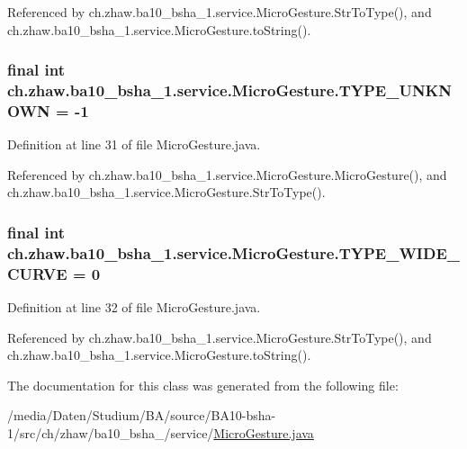 Referenced by ch.zhaw.ba10\_\-bsha\_\-1.service.MicroGesture.StrToType(), and ch.zhaw.ba10\_\-bsha\_\-1.service.MicroGesture.toString().\hypertarget{classch_1_1zhaw_1_1ba10__bsha__1_1_1service_1_1MicroGesture_a5f903774e82629582f34b094f636cc07}{
\subsubsection[{TYPE\_\-UNKNOWN}]{\setlength{\rightskip}{0pt plus 5cm}final int {\bf ch.zhaw.ba10\_\-bsha\_\-1.service.MicroGesture.TYPE\_\-UNKNOWN} = -\/1}}
\label{classch_1_1zhaw_1_1ba10__bsha__1_1_1service_1_1MicroGesture_a5f903774e82629582f34b094f636cc07}


Definition at line 31 of file MicroGesture.java.

Referenced by ch.zhaw.ba10\_\-bsha\_\-1.service.MicroGesture.MicroGesture(), and ch.zhaw.ba10\_\-bsha\_\-1.service.MicroGesture.StrToType().\hypertarget{classch_1_1zhaw_1_1ba10__bsha__1_1_1service_1_1MicroGesture_ae0758406e65bb8e4620eae33908ee771}{
\subsubsection[{TYPE\_\-WIDE\_\-CURVE}]{\setlength{\rightskip}{0pt plus 5cm}final int {\bf ch.zhaw.ba10\_\-bsha\_\-1.service.MicroGesture.TYPE\_\-WIDE\_\-CURVE} = 0}}
\label{classch_1_1zhaw_1_1ba10__bsha__1_1_1service_1_1MicroGesture_ae0758406e65bb8e4620eae33908ee771}


Definition at line 32 of file MicroGesture.java.

Referenced by ch.zhaw.ba10\_\-bsha\_\-1.service.MicroGesture.StrToType(), and ch.zhaw.ba10\_\-bsha\_\-1.service.MicroGesture.toString().

The documentation for this class was generated from the following file:\begin{DoxyCompactItemize}
\item 
/media/Daten/Studium/BA/source/BA10-\/bsha-\/1/src/ch/zhaw/ba10\_\-bsha\_/service/\hyperlink{MicroGesture_8java}{MicroGesture.java}\end{DoxyCompactItemize}
